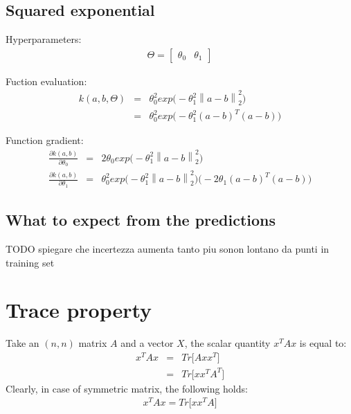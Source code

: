 \documentclass{article}
\begin{document}
\subsection{Squared exponential}

Hyperparameters:
\begin{eqnarray}
\Theta = \begin{bmatrix} \theta_0 & \theta_1 \end{bmatrix}
\end{eqnarray}

Fuction evaluation:
\begin{eqnarray}
k(a,b,\Theta) 
&=& 
\theta_0^2 exp \big ( -\theta_1^2 \left \| a - b \right \| ^2_2 \big ) \\
&=&
\theta_0^2 exp \big ( -\theta_1^2 (a-b)^T (a-b) \big )
\end{eqnarray}

Function gradient:
\begin{eqnarray}
\frac{\partial k (a,b)}{\partial \theta_0} &=& 2 \theta_0 exp \big ( 
-\theta_1^2 \left \| a - b \right \| ^2_2 
\big ) \\
\frac{\partial k (a,b)}{\partial \theta_1} &=& \theta_0^2 exp \big ( 
-\theta_1^2 \left \| a - b \right \| ^2_2 
\big )
\big ( -2 \theta_1(a-b)^T(a-b) \big )
\end{eqnarray}

\subsection{What to expect from the predictions}

TODO spiegare che incertezza aumenta tanto piu sonon lontano da punti in training set

\appendix

\section{Trace property}
\label{sec:trace_property}

Take an $(n,n)$ matrix $A$ and a vector $X$, the scalar quantity $x^T A x$ is equal to:
\begin{eqnarray}
x^T A x &=& Tr \bigg [ 
A xx^T
\bigg ]
\label{eq:Tr_property}
\\
&=& Tr \bigg [ 
xx^T A^T
\bigg ]
\end{eqnarray}
Clearly, in case of symmetric matrix, the following holds:
\begin{eqnarray}
x^T A x = Tr \bigg [ 
xx^T A
\bigg ]
\end{eqnarray}
\end{document}
